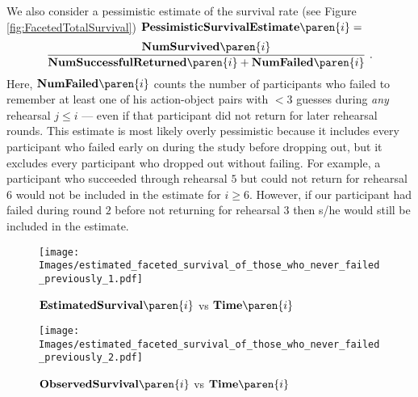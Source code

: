 We also consider a pessimistic estimate of the survival rate (see Figure \ref{fig:FacetedTotalSurvival})  $\mathbf{PessimisticSurvivalEstimate}\paren{i}=$
\[ \frac{\mathbf{NumSurvived}\paren{i}}{\mathbf{NumSuccessfulReturned}\paren{i}+\mathbf{NumFailed}\paren{i}} \ .\]  
Here, $\mathbf{NumFailed}\paren{i}$ counts the number of participants who failed to remember at least one of his action-object pairs with $<3$ guesses during {\em any} rehearsal $j\leq i$ --- even if that participant did not return for later rehearsal rounds. This estimate is most likely overly pessimistic because it includes every participant who failed early on during the study before dropping out, but it excludes every participant who dropped out without failing. For example, a participant who succeeded through rehearsal $5$ but could not return for rehearsal $6$ would not be included in the estimate for $i\geq 6$. However, if our participant had failed during round $2$ before not returning for rehearsal $3$ then s/he would still be included in the estimate.
\begin{figure}[tb]
\centering
\texttt{[image: Images/estimated\_faceted\_survival\_of\_those\_who\_never\_failed\_previously\_1.pdf]}
\caption{$\mathbf{EstimatedSurvival}\paren{i}$ vs $\mathbf{Time}\paren{i}$}
\label{fig:EstimatedFacetedConditionalSurvivalProbability2}
\end{figure}


\begin{figure}
\centering
\texttt{[image: Images/estimated\_faceted\_survival\_of\_those\_who\_never\_failed\_previously\_2.pdf]}
\caption{$\mathbf{ObservedSurvival}\paren{i}$ vs $\mathbf{Time}\paren{i}$}
\label{fig:EstimatedSurvivalProbabilityMethod2}
\end{figure}


